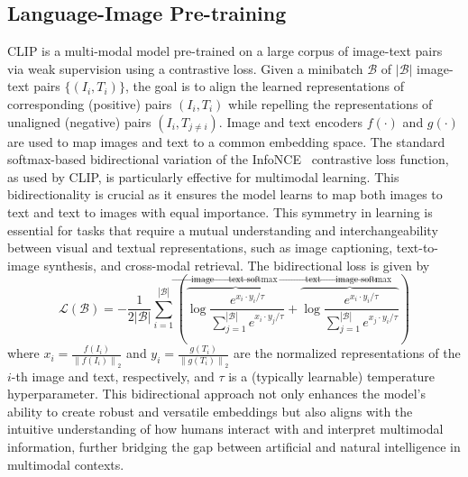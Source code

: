 \documentclass[10pt]{article} %
\begin{document}
\subsection{Language-Image Pre-training}
\label{sec:pretraining}

CLIP \citep[Contrastive Language-Image Pretraining;][]{radford2021learning} is a multi-modal model pre-trained on a large corpus of image-text pairs via weak supervision using a contrastive loss. Given a minibatch $\mathcal{B}$ of $|\mathcal{B}|$ image-text pairs $\{(I_i, T_i)\}$, the goal is to align the learned representations of corresponding (positive) pairs $(I_i, T_i)$ while repelling the representations of unaligned (negative) pairs $(I_i, T_{j\neq i})$. Image and text encoders $f(\cdot)$ and $g(\cdot)$ are used to map images and text to a common embedding space. The standard softmax-based bidirectional variation of the InfoNCE~\citep{oord2018representation} contrastive loss function, as used by CLIP, is particularly effective for multimodal learning. This bidirectionality is crucial as it ensures the model learns to map both images to text and text to images with equal importance. This symmetry in learning is essential for tasks that require a mutual understanding and interchangeability between visual and textual representations, such as image captioning, text-to-image synthesis, and cross-modal retrieval. The bidirectional loss is given by \citep{radford2021learning}
\begin{equation}
\mathcal L(\mathcal B) = -\frac{1}{2|\mathcal{B}|} \sum_{i=1}^{|\mathcal{B}|}\left(\overbrace{\log \frac{e^{{x}_i \cdot {y}_i / \tau}}{\sum_{j=1}^{|\mathcal{B}|} e^{{x}_i \cdot {y}_j / \tau}}}^{\text {image } \rightarrow \text { text softmax }}+\overbrace{\log \frac{e^{{x}_i \cdot {y}_i / \tau}}{\sum_{j=1}^{|\mathcal{B}|} e^{{x}_j \cdot {y}_i / \tau}}}^{\text {text } \rightarrow \text { image softmax }}\right)
\end{equation}
where ${x}_i=\frac{f\left(I_i\right)}{\left\|f\left(I_i\right)\right\|_2}$ and ${y}_i=\frac{g\left(T_i\right)}{\left\|g\left(T_i\right)\right\|_2}$ are the normalized representations of the $i$-th image and text, respectively, and $\tau$ is a (typically learnable) temperature hyperparameter. This bidirectional approach not only enhances the model's ability to create robust and versatile embeddings but also aligns with the intuitive understanding of how humans interact with and interpret multimodal information, further bridging the gap between artificial and natural intelligence in multimodal contexts.
\end{document}
